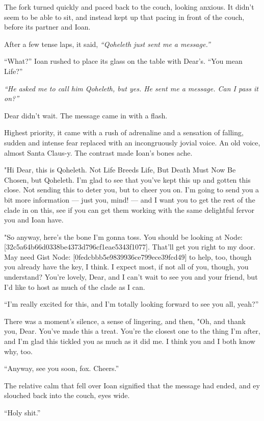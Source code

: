 The fork turned quickly and paced back to the couch, looking anxious. It didn't seem to be able to sit, and instead kept up that pacing in front of the couch, before its partner and Ioan.

After a few tense laps, it said, \emph{``Qoheleth just sent me a message.''}

``What?'' Ioan rushed to place its glass on the table with Dear's. ``You mean Life?''

\emph{``He asked me to call him Qoheleth, but yes. He sent me a message. Can I pass it on?''}

Dear didn't wait. The message came in with a flash.

Highest priority, it came with a rush of adrenaline and a sensation of falling, sudden and intense fear replaced with an incongruously jovial voice. An old voice, almost Santa Claus-y. The contrast made Ioan's bones ache.

"Hi Dear, this is Qoheleth. Not Life Breeds Life, But Death Must Now Be Chosen, but Qoheleth. I'm glad to see that you've kept this up and gotten this close. Not sending this to deter you, but to cheer you on. I'm going to send you a bit more information --- just you, mind! --- and I want you to get the rest of the clade in on this, see if you can get them working with the same delightful fervor you and Ioan have.

"So anyway, here's the bone I'm gonna toss. You should be looking at Node: {[}32c5a64b66d0338be4373d796cf1eae5343f1077{]}. That'll get you right to my door. May need Gist Node: {[}0fedcbbb5e9839936ce799ece39fcd49{]} to help, too, though you already have the key, I think. I expect most, if not all of you, though, you understand? You're lovely, Dear, and I can't wait to see you and your friend, but I'd like to host as much of the clade as I can.

``I'm really excited for this, and I'm totally looking forward to see you all, yeah?''

There was a moment's silence, a sense of lingering, and then, "Oh, and thank you, Dear. You've made this a treat. You're the closest one to the thing I'm after, and I'm glad this tickled you as much as it did me. I think you and I both know why, too.

``Anyway, see you soon, fox. Cheers.''

The relative calm that fell over Ioan signified that the message had ended, and ey slouched back into the couch, eyes wide.

``Holy shit.''

